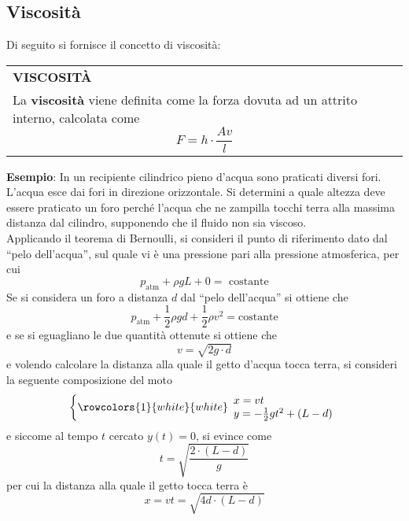 \documentclass[a4paper]{extarticle}
\newcommand{\quotes}[1]{``#1''}
\renewcommand\arraystretch{}
\begin{document}
\vspace{1em}
\subsection{Viscosità}
Di seguito si fornisce il concetto di viscosità:

\vspace{1em}
\setlength{\tabcolsep}{14pt}
\renewcommand{\arraystretch}{2}
\noindent
\begin{tabularx}{\textwidth}{@{}|P|@{}}
    \hline
    {\textbf{VISCOSITÀ}}\\
    \parbox{\linewidth}{La \textbf{viscosità} viene definita come la forza dovuta ad un attrito interno, calcolata come
    \[\boxed{F = h \cdot \frac{A v}{l}}\]
    \vspace{-1mm}}\\
    \hline
\end{tabularx}

\vspace{1em}
\noindent
\textbf{Esempio}: In un recipiente cilindrico pieno d'acqua sono praticati diversi fori. L'acqua esce dai fori in direzione orizzontale. Si determini a quale altezza deve essere praticato un foro perché l'acqua che ne zampilla tocchi terra alla massima distanza dal cilindro, supponendo che il fluido non sia viscoso.\\
Applicando il teorema di Bernoulli, si consideri il punto di riferimento dato dal \quotes{pelo dell'acqua}, sul quale vi è una pressione pari alla pressione atmosferica, per cui
\[p_{\text{atm}} + \rho g L + 0 = \text{ costante}\]
Se si considera un foro a distanza $d$ dal \quotes{pelo dell'acqua} si ottiene che
\[p_{\text{atm}} + \frac{1}{2} \rho g d + \frac{1}{2} \rho v^2 = \text{costante}\]
e se si eguagliano le due quantità ottenute si ottiene che
\[\boxed{v=\sqrt{2g \cdot d}}\]
e volendo calcolare la distanza alla quale il getto d'acqua tocca terra, si consideri la seguente composizione del moto
\[
    \left\{
      \rowcolors{1}{white}{white}
      \begin{array}{l}
        x=vt\\
        y=-\frac{1}{2} g t^2 + (L-d)
      \end{array}
    \right.
\]
e siccome al tempo $t$ cercato $y(t)=0$, si evince come
\[t=\sqrt{\frac{2 \cdot (L-d)}{g}}\]
per cui la distanza alla quale il getto tocca terra è
\[x=vt=\sqrt{4 d \cdot (L-d)}\]

\newpage
\end{document}
